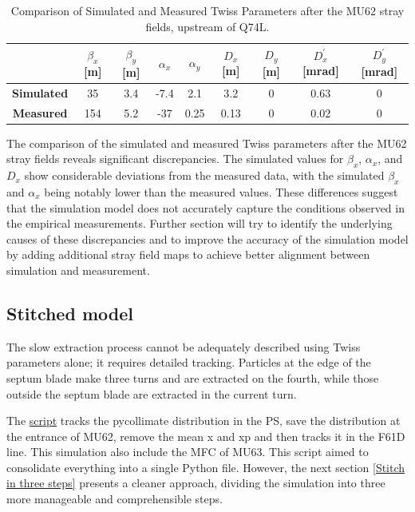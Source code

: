 \begin{table}[htbp]
\centering
\caption{Comparison of Simulated and Measured Twiss Parameters after the MU62 stray fields, upstream of Q74L.}
\label{tab:twiss_comparison}
\begin{tabular}{|c|c|c|c|c|c|c|c|c|}
\hline
& $\beta_{x}$ [m] & $\beta_{y}$ [m] & $\alpha_{x}$ & $\alpha_{y}$ & $D_{x}$ [m] & $D_{y}$ [m] & $D^{'}_{x}$ [mrad] & $D^{'}_{y}$ [mrad] \\
\hline
\textbf{Simulated} & 35 & 3.4 & -7.4 & 2.1 & 3.2 & 0 & 0.63 & 0 \\
\hline
\textbf{Measured} & 154 & 5.2 & -37 & 0.25 & 0.13 & 0 & 0.02 & 0 \\
\hline
\end{tabular}
\end{table}

The comparison of the simulated and measured Twiss parameters after the MU62 stray fields reveals significant discrepancies. The simulated values for $\beta_{x}$, $\alpha_{x}$, and $D_{x}$ show considerable deviations from the measured data, with the simulated $\beta_{x}$ and $\alpha_{x}$ being notably lower than the measured values. These differences suggest that the simulation model does not accurately capture the conditions observed in the empirical measurements. Further section will try to identify the underlying causes of these discrepancies and to improve the accuracy of the simulation model by adding additional stray field maps to achieve better alignment between simulation and measurement.


\subsection{Stitched model}

The slow extraction process cannot be adequately described using Twiss parameters alone; it requires detailed tracking. Particles at the edge of the septum blade make three turns and are extracted on the fourth, while those outside the septum blade are extracted in the current turn.

The \href{https://gitlab.cern.ch/eljohnso/acc-models-tls-eliott-fork/-/blob/EliottBranch/ps_extraction/east-fast-extraction/stitched_slow_extraction_east_PTC_single_turn.ipynb}{script} tracks the pycollimate distribution in the PS, save the distribution at the entrance of MU62, remove the mean x and xp and then tracks it in the F61D line. This simulation also include the MFC of MU63. This script aimed to consolidate everything into a single Python file. However, the next section \ref{Stitch in three steps} presents a cleaner approach, dividing the simulation into three more manageable and comprehensible steps.

